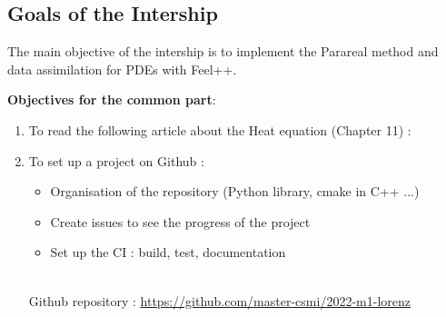 \documentclass[12pt]{article}
\begin{document}
	\subsection{Goals of the Intership}
	\noindent The main objective of the intership is to implement the Parareal method and data assimilation for PDEs with Feel++. 
	\newline
	
	\noindent \textbf{Objectives for the common part}:
    	\begin{enumerate}
        \item To read the following article about the Heat equation (Chapter 11) : \cite{quarteroni_numerical}
			\item To set up a project on Github :
			\begin{itemize}
				\item Organisation of the repository (Python library, cmake in C++ ...)
				\item Create issues to see the progress of the project
				\item Set up the CI : build, test, documentation 
			    \end{itemize}\; \\
		Github repository : \url{https://github.com/master-csmi/2022-m1-lorenz}
	\end{enumerate}
	
\end{document}
